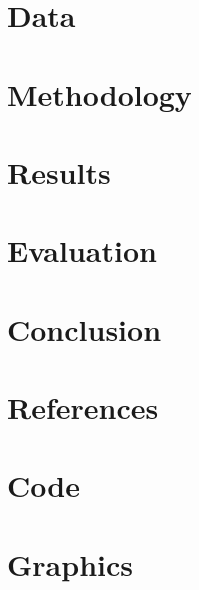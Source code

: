 \documentclass[12pt]{report}
\begin{document}
	\chapter{Data}
	
	
	\chapter{Methodology}
	
	
	\chapter{Results}
	
	
	\chapter{Evaluation}
	
	
	\chapter{Conclusion}
	
	
	
	
	\chapter{References}
	
	

	
	
	\appendix
	
	
	
	\chapter{Code}
	
	
	\chapter{Graphics}
	

	
	
\end{document}
